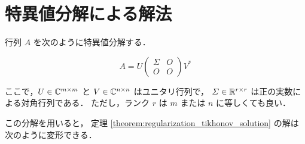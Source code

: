 \section{特異値分解による解法}

行列 $A$ を次のように特異値分解する．

\begin{equation}
    A = U
    \begin{pmatrix}
        \Sigma & O \\
        O      & O
    \end{pmatrix}
    V^*
\end{equation}

ここで，$U \in \mathbb{C}^{m \times m}$ と $V \in \mathbb{C}^{n \times n}$ はユニタリ行列で，
$\varSigma \in \mathbb{R}^{r \times r}$ は正の実数による対角行列である．
ただし，ランク $r$ は $m$ または $n$ に等しくても良い．

この分解を用いると，
定理 \ref{theorem:regularization_tikhonov_solution} の解は次のように変形できる．

